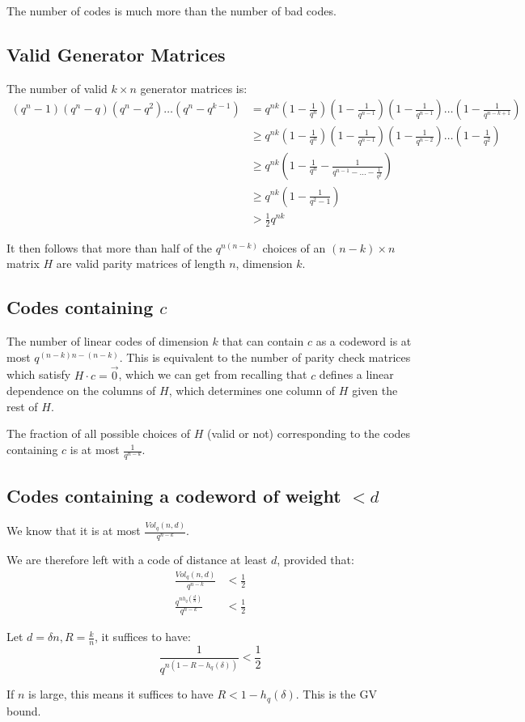 \documentclass[11pt]{article}
\begin{document}
The number of codes is much more than the number of bad codes.

\subsection{Valid Generator Matrices}
The number of valid $k \times n$ generator matrices is:
\begin{align*}
  (q^n - 1)(q^n - q)(q^n - q^2) \ldots (q^n - q^{k - 1})
  &= q^{nk} \left(1 - \frac{1}{q^n}\right)\left(1 - \frac{1}{q^{n - 1}}\right)\left(1 - \frac{1}{q^{n - 1}}\right)\ldots\left(1 - \frac{1}{q^{n - k + 1}}\right) \\
  &\geq q^{nk}\left(1 - \frac{1}{q^n}\right)\left(1 - \frac{1}{q^{n - 1}}\right)\left(1 - \frac{1}{q^{n - 2}}\right)\ldots\left(1 - \frac{1}{q^2}\right) \\
  &\geq q^{nk} \left(1 - \frac{1}{q^n} - \frac{1}{q^{n - 1} - \ldots - \frac{1}{q^2}}\right) \\
  &\geq q^{nk} \left(1 - \frac{1}{q^2 - 1}\right) \\
  &> \frac{1}{2}q^{nk}
\end{align*}

It then follows that more than half of the $q^{n(n - k)}$ choices of an $(n - k) \times n$ matrix $H$ are valid parity matrices of length $n$, dimension $k$.

\subsection{Codes containing $c$}
The number of linear codes of dimension $k$ that can contain $c$ as a codeword is at most $q^{(n - k)n - (n - k)}$.
This is equivalent to the number of parity check matrices which satisfy $H \cdot c = \overrightarrow{0}$, which we can get from recalling that $c$ defines a linear dependence on the columns of $H$, which determines one column of $H$ given the rest of $H$.

The fraction of all possible choices of $H$ (valid or not) corresponding to the codes containing $c$ is at most $\frac{1}{q^{n - k}}$.

\subsection{Codes containing a codeword of weight $< d$}
We know that it is at most $\frac{Vol_q(n, d)}{q^{n - k}}$.

We are therefore left with a code of distance at least $d$, provided that:
\begin{align*}
  \frac{Vol_q(n, d)}{q^{n - k}} &< \frac{1}{2} \\
  \frac{q^{nh_q\left(\frac{d}{n}\right)}}{q^{n - k}} &< \frac{1}{2}
\end{align*}

Let $d = \delta n, R = \frac{k}{n}$, it suffices to have:
\[
  \frac{1}{q^{n(1 - R - h_q(\delta))}} < \frac{1}{2}
\]

If $n$ is large, this means it suffices to have $R < 1 - h_q(\delta)$.
This is the GV bound.
\end{document}
